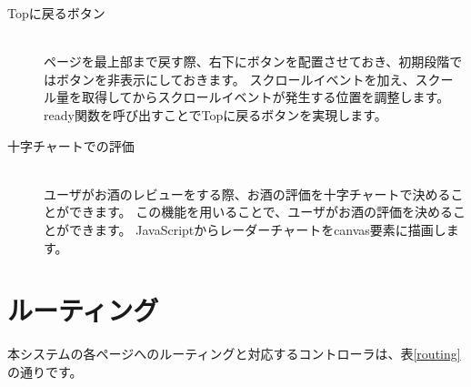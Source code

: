 \documentclass[a4j,titlepage]{jarticle}
\begin{document}
\begin{description}
\item[Topに戻るボタン]~\\
ページを最上部まで戻す際、右下にボタンを配置させておき、初期段階ではボタンを非表示にしておきます。
スクロールイベントを加え、スクール量を取得してからスクロールイベントが発生する位置を調整します。
ready関数を呼び出すことでTopに戻るボタンを実現します。

\item[十字チャートでの評価]~\\
ユーザがお酒のレビューをする際、お酒の評価を十字チャートで決めることができます。
この機能を用いることで、ユーザがお酒の評価を決めることができます。
JavaScriptからレーダーチャートをcanvas要素に描画します。

\end{description}

\newpage
\section{ルーティング}
本システムの各ページへのルーティングと対応するコントローラは、表\ref{routing}の通りです。
\end{document}
